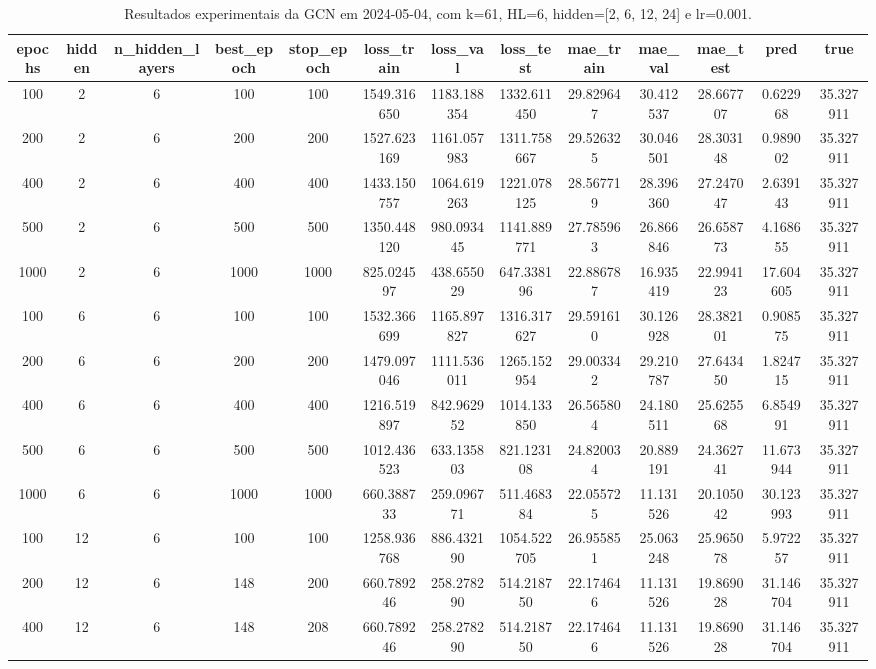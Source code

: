 \begin{table}[h]
\centering
\caption{Resultados experimentais da GCN em 2024-05-04, com k=61, HL=6, hidden=[2, 6, 12, 24] e lr=0.001.}
\label{tab:gcn_results_k61_hl6_d20240504}
\begin{tabular}{ccccccccccccc}
\toprule
epochs & hidden & n\_hidden\_layers & best\_epoch & stop\_epoch & loss\_train & loss\_val & loss\_test & mae\_train & mae\_val & mae\_test & pred & true \\
\midrule
100 & 2 & 6 & 100 & 100 & 1549.316650 & 1183.188354 & 1332.611450 & 29.829647 & 30.412537 & 28.667707 & 0.622968 & 35.327911 \\
200 & 2 & 6 & 200 & 200 & 1527.623169 & 1161.057983 & 1311.758667 & 29.526325 & 30.046501 & 28.303148 & 0.989002 & 35.327911 \\
400 & 2 & 6 & 400 & 400 & 1433.150757 & 1064.619263 & 1221.078125 & 28.567719 & 28.396360 & 27.247047 & 2.639143 & 35.327911 \\
500 & 2 & 6 & 500 & 500 & 1350.448120 & 980.093445 & 1141.889771 & 27.785963 & 26.866846 & 26.658773 & 4.168655 & 35.327911 \\
1000 & 2 & 6 & 1000 & 1000 & 825.024597 & 438.655029 & 647.338196 & 22.886787 & 16.935419 & 22.994123 & 17.604605 & 35.327911 \\
100 & 6 & 6 & 100 & 100 & 1532.366699 & 1165.897827 & 1316.317627 & 29.591610 & 30.126928 & 28.382101 & 0.908575 & 35.327911 \\
200 & 6 & 6 & 200 & 200 & 1479.097046 & 1111.536011 & 1265.152954 & 29.003342 & 29.210787 & 27.643450 & 1.824715 & 35.327911 \\
400 & 6 & 6 & 400 & 400 & 1216.519897 & 842.962952 & 1014.133850 & 26.565804 & 24.180511 & 25.625568 & 6.854991 & 35.327911 \\
500 & 6 & 6 & 500 & 500 & 1012.436523 & 633.135803 & 821.123108 & 24.820034 & 20.889191 & 24.362741 & 11.673944 & 35.327911 \\
1000 & 6 & 6 & 1000 & 1000 & 660.388733 & 259.096771 & 511.468384 & 22.055725 & 11.131526 & 20.105042 & 30.123993 & 35.327911 \\
100 & 12 & 6 & 100 & 100 & 1258.936768 & 886.432190 & 1054.522705 & 26.955851 & 25.063248 & 25.965078 & 5.972257 & 35.327911 \\
200 & 12 & 6 & 148 & 200 & 660.789246 & 258.278290 & 514.218750 & 22.174646 & 11.131526 & 19.869028 & 31.146704 & 35.327911 \\
400 & 12 & 6 & 148 & 208 & 660.789246 & 258.278290 & 514.218750 & 22.174646 & 11.131526 & 19.869028 & 31.146704 & 35.327911 \\

\end{tabular}
\end{table}
